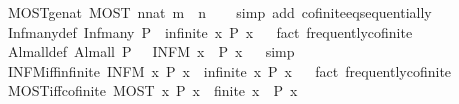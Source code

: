 \begin{isabellebody}
%
\isadelimproof
\isanewline
%
\endisadelimproof
\isanewline
{}\isamarkupfalse%
\ MOST{\isacharunderscore}ge{\isacharunderscore}nat{\isacharcolon}\ {\isachardoublequoteopen}MOST\ n{\isacharcolon}{\isacharcolon}nat{\isachardot}\ m\ {\isasymle}\ n{\isachardoublequoteclose}\isanewline
%
\isadelimproof
\ \ %
\endisadelimproof
%
\isatagproof
{}\isamarkupfalse%
\ {\isacharparenleft}simp\ add{\isacharcolon}\ cofinite{\isacharunderscore}eq{\isacharunderscore}sequentially{\isacharparenright}\isanewline
\isanewline
%
%
\endisatagproof
{\isafoldproof}%
%
\isadelimproof
\isanewline
%
\endisadelimproof
{}\isamarkupfalse%
\ Inf{\isacharunderscore}many{\isacharunderscore}def{\isacharcolon}\ {\isachardoublequoteopen}Inf{\isacharunderscore}many\ P\ {\isasymlongleftrightarrow}\ infinite\ {\isacharbraceleft}x{\isachardot}\ P\ x{\isacharbraceright}{\isachardoublequoteclose}%
\isadelimproof
\ %
\endisadelimproof
%
\isatagproof
{}\isamarkupfalse%
\ {\isacharparenleft}fact\ frequently{\isacharunderscore}cofinite{\isacharparenright}%
\endisatagproof
{\isafoldproof}%
%
\isadelimproof
%
\endisadelimproof
\isanewline
{}\isamarkupfalse%
\ Alm{\isacharunderscore}all{\isacharunderscore}def{\isacharcolon}\ {\isachardoublequoteopen}Alm{\isacharunderscore}all\ P\ {\isasymlongleftrightarrow}\ {\isasymnot}\ {\isacharparenleft}INFM\ x{\isachardot}\ {\isasymnot}\ P\ x{\isacharparenright}{\isachardoublequoteclose}%
\isadelimproof
\ %
\endisadelimproof
%
\isatagproof
{}\isamarkupfalse%
\ simp%
\endisatagproof
{\isafoldproof}%
%
\isadelimproof
%
\endisadelimproof
\isanewline
{}\isamarkupfalse%
\ INFM{\isacharunderscore}iff{\isacharunderscore}infinite{\isacharcolon}\ {\isachardoublequoteopen}{\isacharparenleft}INFM\ x{\isachardot}\ P\ x{\isacharparenright}\ {\isasymlongleftrightarrow}\ infinite\ {\isacharbraceleft}x{\isachardot}\ P\ x{\isacharbraceright}{\isachardoublequoteclose}%
\isadelimproof
\ %
\endisadelimproof
%
\isatagproof
{}\isamarkupfalse%
\ {\isacharparenleft}fact\ frequently{\isacharunderscore}cofinite{\isacharparenright}%
\endisatagproof
{\isafoldproof}%
%
\isadelimproof
%
\endisadelimproof
\isanewline
{}\isamarkupfalse%
\ MOST{\isacharunderscore}iff{\isacharunderscore}cofinite{\isacharcolon}\ {\isachardoublequoteopen}{\isacharparenleft}MOST\ x{\isachardot}\ P\ x{\isacharparenright}\ {\isasymlongleftrightarrow}\ finite\ {\isacharbraceleft}x{\isachardot}\ {\isasymnot}\ P\ x{\isacharbraceright}{\isachardoublequoteclose}%
\isadelimproof

\end{isabellebody}
